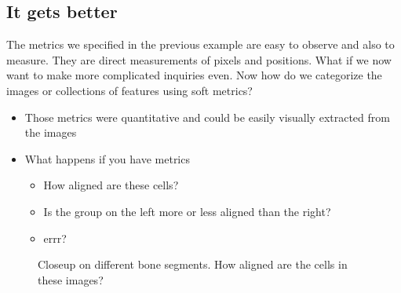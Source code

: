 \documentclass[letterpaper,10pt,english]{sphinxmanual}
\begin{document}
\subsection{It gets better}
\label{\detokenize{01-Introduction:it-gets-better}}
\sphinxAtStartPar
The metrics we specified in the previous example are easy to observe and also to measure. They are direct measurements of pixels and positions. What if we now want to make more complicated inquiries even. Now how do we categorize the images or collections of features using soft metrics?
\begin{itemize}
\item {} 
\sphinxAtStartPar
Those metrics were quantitative and could be easily visually extracted from the images

\item {} 
\sphinxAtStartPar
What happens if you have  metrics
\begin{itemize}
\item {} 
\sphinxAtStartPar
How aligned are these cells?

\item {} 
\sphinxAtStartPar
Is the group on the left more or less aligned than the right?

\item {} 
\sphinxAtStartPar
errr?

\end{itemize}

\end{itemize}



\begin{figure}[htbp]
\centering
\capstart

\noindent{}
\caption{Close\sphinxhyphen{}up on different bone segments. How aligned are the cells in these images?}\label{\detokenize{01-Introduction:id13}}\end{figure}
\end{document}
